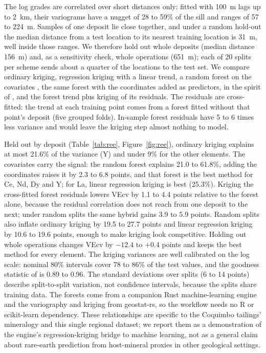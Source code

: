 \documentclass[preprint,12pt,authoryear]{elsarticle}
\begin{document}
The log grades are correlated over short distances only: fitted with 100~m lags
up to 2~km, their variograms have a nugget of 28 to 59\% of the sill and ranges
of 57 to 224~m. Samples of one deposit lie close together, and under a random
hold-out the median distance from a test location to its nearest training
location is 31~m, well inside those ranges. We therefore hold out whole
deposits (median distance 156~m) and, as a sensitivity check, whole operations
(651~m); each of 20 splits per scheme sends about a quarter of the locations
to the test set. We compare ordinary kriging, regression kriging with a linear
trend, a random forest on the covariates \citep{smelt}, the same forest with
the coordinates added as predictors, in the spirit of \citet{hengl2018}, and
the forest trend plus kriging of its residuals. The residuals are
cross-fitted: the trend at each training point comes from a forest fitted
without that point's deposit (five grouped folds). In-sample forest residuals
have 5 to 6 times less variance and would leave the kriging step almost nothing
to model.

Held out by deposit (Table~\ref{tab:ree}, Figure~\ref{fig:ree}), ordinary
kriging explains at most 21.6\% of the variance (Y) and under 9\% for the other
elements. The covariates carry the signal: the random forest explains 21.0 to
61.8\%, adding the coordinates raises it by 2.3 to 6.8 points, and that forest
is the best method for Ce, Nd, Dy and Y; for La, linear regression kriging is
best (25.3\%). Kriging the cross-fitted forest residuals lowers VEcv by 1.1 to
4.4 points relative to the forest alone, because the residual correlation does
not reach from one deposit to the next; under random splits the same hybrid
gains 3.9 to 5.9 points. Random splits also inflate ordinary kriging by 19.5 to
27.7 points and linear regression kriging by 10.6 to 19.6 points, enough to
make kriging look competitive. Holding out whole operations changes VEcv by
$-12.4$ to $+0.4$ points and keeps the best method for every element. The
kriging variances are well calibrated on the log scale: nominal 80\% intervals
cover 78 to 86\% of the test values, and the goodness statistic of
\citet{deutsch1997} is 0.89 to 0.96. The standard deviations over splits (6 to
14 points) describe split-to-split variation, not confidence intervals,
because the splits share training data. The forests come from a companion Rust
machine-learning engine \citep{smelt} and the variography and kriging from
geostat-rs, so the workflow needs no \textsf{R} or scikit-learn dependency. These
relationships are specific to the Coquimbo tailings' mineralogy and this single
regional dataset; we report them as a demonstration of the engine's
regression-kriging bridge to machine learning, not as a general claim about
rare-earth prediction from host-mineral proxies in other geological
settings.
\end{document}
